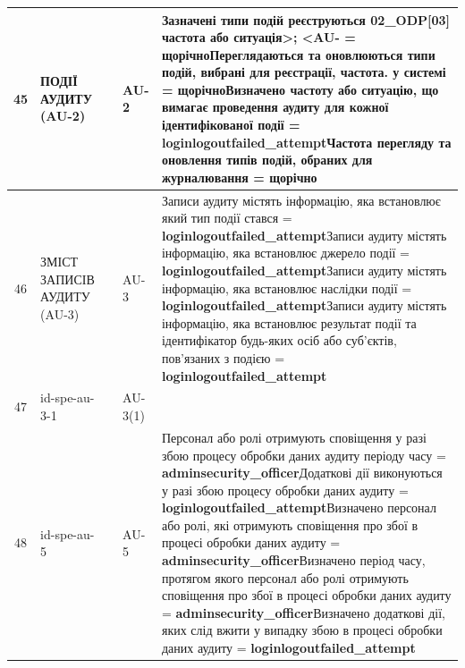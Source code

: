 \documentclass[10pt]{article}
\begin{document}
\begin{longtable}{|c|>{\raggedright\arraybackslash}p{2.5cm}|>{\raggedright\arraybackslash}p{4.5cm}|>{\raggedright\arraybackslash}p{3cm}|>{\raggedright\arraybackslash}p{4.5cm}|}
45 & ПОДІЇ АУДИТУ (AU-2) &  & AU-2 & Зазначені типи подій реєструються 02\_\allowbreak{}ODP[03] частота або ситуація>; <AU- = \textbf{щорічно}\newline Переглядаються та оновлюються типи подій, вибрані для реєстрації, частота. у системі = \textbf{щорічно}\newline Визначено частоту або ситуацію, що вимагає проведення аудиту для кожної ідентифікованої події = \textbf{loginlogoutfailed\_\allowbreak{}attempt}\newline Частота перегляду та оновлення типів подій, обраних для журналювання = \textbf{щорічно} \\ \hline
46 & ЗМІСТ ЗАПИСІВ АУДИТУ (AU-3) &  & AU-3 & Записи аудиту містять інформацію, яка встановлює який тип події стався = \textbf{loginlogoutfailed\_\allowbreak{}attempt}\newline Записи аудиту містять інформацію, яка встановлює джерело події = \textbf{loginlogoutfailed\_\allowbreak{}attempt}\newline Записи аудиту містять інформацію, яка встановлює наслідки події = \textbf{loginlogoutfailed\_\allowbreak{}attempt}\newline Записи аудиту містять інформацію, яка встановлює результат події та ідентифікатор будь-яких осіб або суб'єктів, пов'язаних з подією = \textbf{loginlogoutfailed\_\allowbreak{}attempt} \\ \hline
47 & id-spe-au-3-1 &  & AU-3(1) &  \\ \hline
48 & id-spe-au-5 &  & AU-5 & Персонал або ролі отримують сповіщення у разі збою процесу обробки даних аудиту періоду часу = \textbf{adminsecurity\_\allowbreak{}officer}\newline Додаткові дії виконуються у разі збою процесу обробки даних аудиту = \textbf{loginlogoutfailed\_\allowbreak{}attempt}\newline Визначено персонал або ролі, які отримують сповіщення про збої в процесі обробки даних аудиту  = \textbf{adminsecurity\_\allowbreak{}officer}\newline Визначено період часу, протягом якого персонал або ролі отримують сповіщення про збої в процесі обробки даних аудиту = \textbf{adminsecurity\_\allowbreak{}officer}\newline Визначено додаткові дії, яких слід вжити у випадку збою в процесі обробки даних аудиту  = \textbf{loginlogoutfailed\_\allowbreak{}attempt} \\ \hline

\end{longtable}
\end{document}
